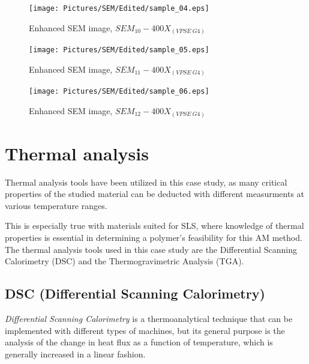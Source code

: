 \documentclass{article}
\begin{document}
                \begin{figure}[h!]
                    \centering 
                    \texttt{[image: Pictures/SEM/Edited/sample\_04.eps]}
                    \caption{Enhanced SEM image, $SEM_{10}-400X_{(VPSE \ G4)}$ \autocites{Pixelmator_Pro}{GIMP}}
                    \label{fig:SEM_10}
                \end{figure}

                \begin{figure}[h!]
                    \centering 
                    \texttt{[image: Pictures/SEM/Edited/sample\_05.eps]}
                    \caption{Enhanced SEM image, $SEM_{11}-400X_{(VPSE \ G4)}$ \autocites{Pixelmator_Pro}{GIMP}}
                    \label{fig:SEM_11}
                \end{figure}

                \begin{figure}[h!]
                    \centering 
                    \texttt{[image: Pictures/SEM/Edited/sample\_06.eps]}
                    \caption{Enhanced SEM image, $SEM_{12}-400X_{(VPSE \ G4)}$ \autocites{Pixelmator_Pro}{GIMP}}
                    \label{fig:SEM_12}
                \end{figure}
    \clearpage
    \section{Thermal analysis\label{Thermal_analysis}}
    
    Thermal analysis tools have been utilized in this case study, as many critical properties of the studied material 
    can be deducted with different measurments at various temperature ranges. 

    This is especially true with materials suited for SLS, where knowledge of thermal properties is 
    essential in determining a polymer's feasibility for this AM method. 
    The thermal analysis tools used in this case study are the Differential Scanning Calorimetry (DSC) and the Thermogravimetric Analysis (TGA).


        \subsection{DSC (Differential Scanning Calorimetry)\label{DSC_analysis}}
        
        \textit{Differential Scanning Calorimetry} is a thermoanalytical technique that can be implemented with different types of machines, 
        but its general purpose is the analysis of the change in heat flux as a function of temperature, which is generally increased in 
        a linear fashion. 
    
\end{document}
